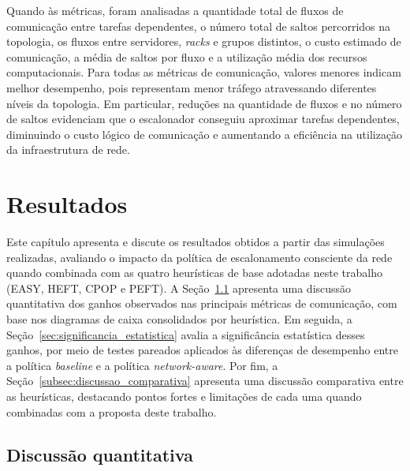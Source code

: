 \documentclass[12pt]{article}
\begin{document}
Quando às métricas, foram analisadas a quantidade total de fluxos de comunicação entre tarefas dependentes, o número total de saltos percorridos na topologia, os fluxos entre servidores, \textit{racks} e grupos distintos, o custo estimado de comunicação, a média de saltos por fluxo e a utilização média dos recursos computacionais.
%
Para todas as métricas de comunicação, valores menores indicam melhor desempenho, pois representam menor tráfego atravessando diferentes níveis da topologia. Em particular, reduções na quantidade de fluxos e no número de saltos evidenciam que o escalonador conseguiu aproximar tarefas dependentes, diminuindo o custo lógico de comunicação e aumentando a eficiência na utilização da infraestrutura de rede.

\section{Resultados}
\label{sec:resultados_discussao}

Este capítulo apresenta e discute os resultados obtidos a partir das simulações realizadas, avaliando o impacto da política de escalonamento consciente da rede quando combinada com as quatro heurísticas de base adotadas neste trabalho (EASY, HEFT, CPOP e PEFT). A Seção~\ref{subsec:discussao_quantitativa} apresenta uma discussão quantitativa dos ganhos observados nas principais métricas de comunicação, com base nos diagramas de caixa consolidados por heurística. Em seguida, a Seção~\ref{sec:significancia_estatistica} avalia a significância estatística desses ganhos, por meio de testes pareados aplicados às diferenças de desempenho entre a política \textit{baseline} e a política \textit{network-aware}. Por fim, a Seção~\ref{subsec:discussao_comparativa} apresenta uma discussão comparativa entre as heurísticas, destacando pontos fortes e limitações de cada uma quando combinadas com a proposta deste trabalho.


\subsection{Discussão quantitativa}
\label{subsec:discussao_quantitativa}
\end{document}
